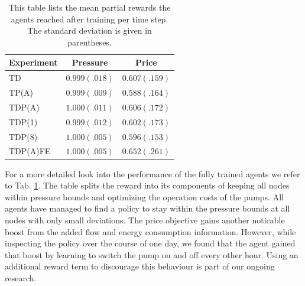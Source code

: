 
\begin{table}
    \begin{tabular}{l|c|c}
         Experiment & Pressure & Price \\
         \hline
         TD & $0.999 (.018)$ & $0.607 (.159)$\\
         TP(A) & $0.999 (.009)$ & $0.588 (.164)$\\
         TDP(A) & $1.000 (.011)$ & $0.606 (.172)$\\
         TDP(1) & $0.999 (.012)$ & $0.602 (.173)$\\
         TDP(8) & $\mathbf{1.000 (.005)}$ & $0.596 (.153)$\\
         TDP(A)FE & $\mathbf{1.000 (.005)}$ & $\mathbf{0.652 (.261)}$\\
    \end{tabular}
    \caption{This table lists the mean partial rewards the agents reached after training per time step. The standard deviation is given in parentheses.}
    \label{tab:rewards}
\end{table}

For a more detailed look into the performance of the fully trained agents we refer to Tab. \ref{tab:rewards}.
The table splits the reward into its components of keeping all nodes within pressure bounds and optimizing the operation costs of the pumps.
All agents have managed to find a policy to stay within the pressure bounds at all nodes with only small deviations.
The price objective gains another noticable boost from the added flow and energy consumption information.
However, while inspecting the policy over the course of one day, we found that
the agent gained that boost by learning to switch the pump on and off every
other hour. Using an additional reward term to discourage this behaviour is
part of our ongoing research.


